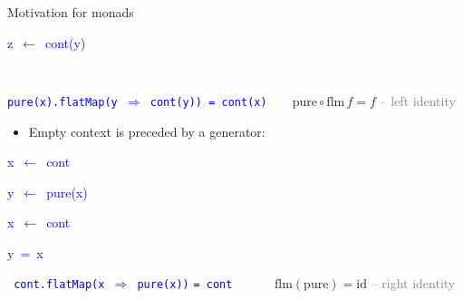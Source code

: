 \documentclass[english]{beamer}
\newenvironment{lyxcode}
  {\par\begin{list}{}{
    \setlength{\rightmargin}{\leftmargin}
    \setlength{\listparindent}{0pt}%
    \raggedright
    \setlength{\itemsep}{0pt}
    \setlength{\parsep}{0pt}
    \normalfont\ttfamily}%
   \def\{{\char`\{}
   \def\}{\char`\}}
   \def\textasciitilde{\char`\~}
   \item[]}
  {\end{list}}
\begin{document}
\begin{frame}{Motivation for monads}
\begin{minipage}[c][1\totalheight][t]{0.4\columnwidth}
\begin{lyxcode}
\textcolor{blue}{\footnotesize{}z~$\leftarrow$~cont(y)}{\footnotesize\par}
\end{lyxcode}
%
\end{minipage}\texttt{\textcolor{blue}{\footnotesize{}\hfill{}\medskip{}
}}{\footnotesize\par}

\texttt{\textcolor{blue}{\footnotesize{}pure(x).flatMap(y $\Rightarrow$
cont(y)) = cont(x)}}$\quad\quad\text{pure}\circ\text{flm}\,f=f$ \textcolor{gray}{--
left identity}
\begin{itemize}
\item Empty context is preceded by a generator:
\end{itemize}
\texttt{\textcolor{blue}{\footnotesize{}}}%
\begin{minipage}[c][1\totalheight][t]{0.49\columnwidth}%
\begin{lyxcode}
\textcolor{blue}{\footnotesize{}x~$\leftarrow$~cont}{\footnotesize\par}

\textcolor{blue}{\footnotesize{}y~$\leftarrow$~pure(x)}{\footnotesize\par}
\end{lyxcode}
%
\end{minipage}\texttt{\textcolor{blue}{\footnotesize{}\hfill{}}}%
\begin{minipage}[c][1\totalheight][t]{0.49\columnwidth}%
\begin{lyxcode}
\textcolor{blue}{\footnotesize{}x~$\leftarrow$~cont}{\footnotesize\par}

\textcolor{blue}{\footnotesize{}y~=~x}{\footnotesize\par}
\end{lyxcode}
%
\end{minipage}\texttt{\textcolor{blue}{\footnotesize{}\hfill{}\medskip{}
cont.flatMap(x $\Rightarrow$ pure(x))}} \texttt{\textcolor{blue}{\footnotesize{}=
cont}} $\quad\quad\quad\text{flm}\left(\text{pure}\right)=\text{id}$
\textcolor{gray}{-- right identity}
\end{frame}
\end{document}
